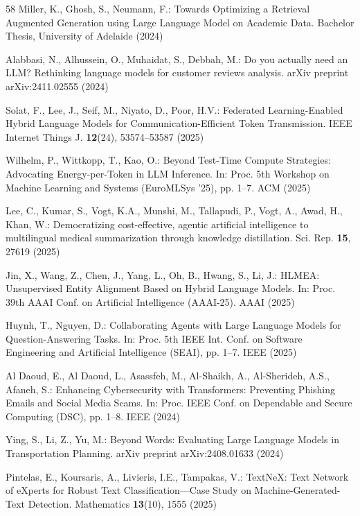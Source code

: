 \begin{thebibliography}{58}
Miller, K., Ghosh, S., Neumann, F.: Towards Optimizing a Retrieval Augmented Generation using Large Language Model on Academic Data. Bachelor Thesis, University of Adelaide (2024)

Alabbasi, N., Alhussein, O., Muhaidat, S., Debbah, M.: Do you actually need an LLM? Rethinking language models for customer reviews analysis. arXiv preprint arXiv:2411.02555 (2024)

Solat, F., Lee, J., Seif, M., Niyato, D., Poor, H.V.: Federated Learning-Enabled Hybrid Language Models for Communication-Efficient Token Transmission. IEEE Internet Things J. \textbf{12}(24), 53574--53587 (2025)

Wilhelm, P., Wittkopp, T., Kao, O.: Beyond Test-Time Compute Strategies: Advocating Energy-per-Token in LLM Inference. In: Proc. 5th Workshop on Machine Learning and Systems (EuroMLSys '25), pp. 1--7. ACM (2025)

Lee, C., Kumar, S., Vogt, K.A., Munshi, M., Tallapudi, P., Vogt, A., Awad, H., Khan, W.: Democratizing cost-effective, agentic artificial intelligence to multilingual medical summarization through knowledge distillation. Sci. Rep. \textbf{15}, 27619 (2025)

Jin, X., Wang, Z., Chen, J., Yang, L., Oh, B., Hwang, S., Li, J.: HLMEA: Unsupervised Entity Alignment Based on Hybrid Language Models. In: Proc. 39th AAAI Conf. on Artificial Intelligence (AAAI-25). AAAI (2025)

Huynh, T., Nguyen, D.: Collaborating Agents with Large Language Models for Question-Answering Tasks. In: Proc. 5th IEEE Int. Conf. on Software Engineering and Artificial Intelligence (SEAI), pp. 1--7. IEEE (2025)

Al Daoud, E., Al Daoud, L., Asassfeh, M., Al-Shaikh, A., Al-Sherideh, A.S., Afaneh, S.: Enhancing Cybersecurity with Transformers: Preventing Phishing Emails and Social Media Scams. In: Proc. IEEE Conf. on Dependable and Secure Computing (DSC), pp. 1--8. IEEE (2024)

Ying, S., Li, Z., Yu, M.: Beyond Words: Evaluating Large Language Models in Transportation Planning. arXiv preprint arXiv:2408.01633 (2024)

Pintelas, E., Koursaris, A., Livieris, I.E., Tampakas, V.: TextNeX: Text Network of eXperts for Robust Text Classification—Case Study on Machine-Generated-Text Detection. Mathematics \textbf{13}(10), 1555 (2025)


\end{thebibliography}
